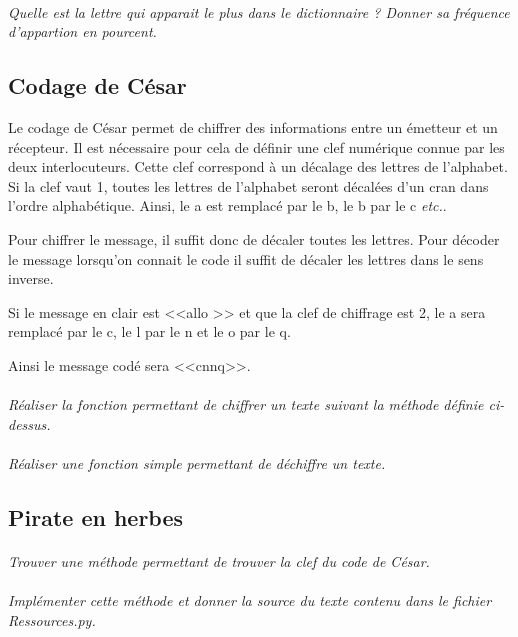 \documentclass[11pt,oneside]{article}
\begin{document}
\paragraph{}
\textit{Quelle est la lettre qui apparait le plus dans le dictionnaire ? Donner sa fréquence d'appartion en pourcent.}

\subsection*{Codage de César}

Le codage de César permet de chiffrer des informations entre un émetteur et un récepteur. Il est nécessaire pour cela de définir une clef numérique connue par les deux interlocuteurs. Cette clef correspond à un décalage des lettres de l'alphabet. Si la clef vaut 1, toutes les lettres de l'alphabet seront décalées d'un cran dans l'ordre alphabétique. Ainsi, le a est remplacé par le b, le b par le c \textit{etc.}. 

Pour chiffrer le message, il suffit donc de décaler toutes les lettres. Pour décoder le message lorsqu'on connait le code il suffit de décaler les lettres dans le sens inverse.

\begin{exemple}
Si le message en clair est <<allo >> et que la clef de chiffrage est 2, le a sera remplacé par le c, le l par le n et le o par le q.

Ainsi le message codé sera <<cnnq>>.

\end{exemple}

\paragraph{}
\textit{Réaliser la fonction permettant de chiffrer un texte suivant la méthode définie ci-dessus.}

\paragraph{}
\textit{Réaliser une fonction simple permettant de déchiffre un texte.}

\subsection*{Pirate en herbes}

\paragraph{}
\textit{Trouver une méthode permettant de trouver la clef du code de César.}

\paragraph{}
\textit{Implémenter cette méthode et donner la source du texte contenu dans le fichier \textsf{Ressources.py}.}
\end{document}
